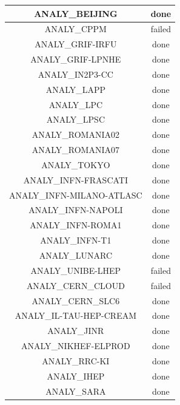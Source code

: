 \begin{longtable}{|c|c|}
	\hline
	\color{black}ANALY\_BEIJING & \color{green}done \\
	\hline
	\color{black}ANALY\_CPPM & \color{red}failed \\
	\hline
	\color{black}ANALY\_GRIF-IRFU & \color{green}done \\
	\hline
	\hline
	\color{black}ANALY\_GRIF-LPNHE & \color{green}done \\
	\hline
	\color{black}ANALY\_IN2P3-CC & \color{green}done \\
	\hline
	\color{black}ANALY\_LAPP & \color{green}done \\
	\hline
	\color{black}ANALY\_LPC & \color{green}done \\
	\hline
	\color{black}ANALY\_LPSC & \color{green}done \\
	\hline
	\color{black}ANALY\_ROMANIA02 & \color{green}done \\
	\hline
	\color{black}ANALY\_ROMANIA07 & \color{green}done \\
	\hline
	\color{black}ANALY\_TOKYO & \color{green}done \\
	\hline
	\color{black}ANALY\_INFN-FRASCATI & \color{green}done \\
	\hline
	\color{black}ANALY\_INFN-MILANO-ATLASC & \color{green}done \\
	\hline
	\color{black}ANALY\_INFN-NAPOLI & \color{green}done \\
	\hline
	\color{black}ANALY\_INFN-ROMA1 & \color{green}done \\
	\hline
	\color{black}ANALY\_INFN-T1 & \color{green}done \\
	\hline
	\hline
	\color{black}ANALY\_LUNARC & \color{green}done \\
	\hline
	\color{black}ANALY\_UNIBE-LHEP & \color{red}failed \\
	\hline
	\color{black}ANALY\_CERN\_CLOUD & \color{red}failed \\
	\hline
	\color{black}ANALY\_CERN\_SLC6 & \color{green}done \\
	\hline
	\color{black}ANALY\_IL-TAU-HEP-CREAM & \color{green}done \\
	\hline
	\color{black}ANALY\_JINR & \color{green}done \\
	\hline
	\color{black}ANALY\_NIKHEF-ELPROD & \color{green}done \\
	\hline
	\color{black}ANALY\_RRC-KI & \color{green}done \\
	\hline
	\color{black}ANALY\_IHEP & \color{green}done \\
	\hline
	\color{black}ANALY\_SARA & \color{green}done \\

\end{longtable}
